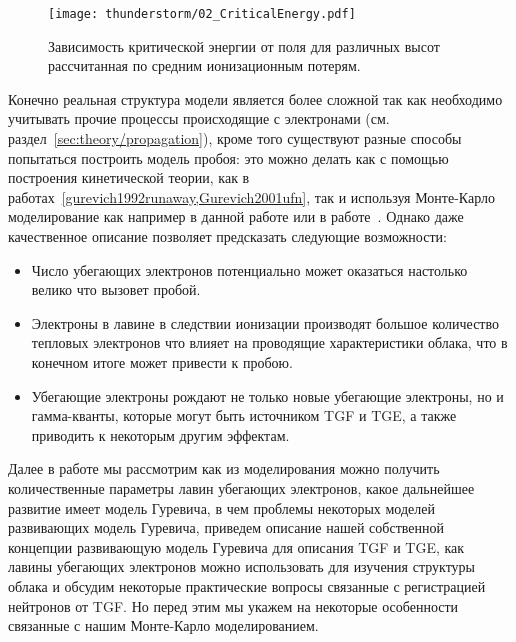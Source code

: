 \begin{figure}[t]
    \begin{center}

\texttt{[image: thunderstorm/02\_CriticalEnergy.pdf]} 
        \caption{Зависимость критической энергии от поля для различных высот рассчитанная по средним ионизационным потерям.}
    \end{center}
    \label{fig:storm:crit}
\end{figure}
Конечно реальная структура модели является более сложной так как необходимо учитывать прочие процессы происходящие с электронами (см. раздел~\ref{sec:theory/propagation}), кроме того существуют разные способы попытаться построить модель пробоя: это можно делать как с помощью построения кинетической теории, как в работах~\ref{gurevich1992runaway,Gurevich2001ufn}, так и используя Монте-Карло моделирование как например в данной работе или в работе~\cite{dwyer2003fundamental}. Однако даже качественное описание позволяет предсказать следующие возможности:
\begin{itemize}
   \item Число убегающих электронов потенциально может оказаться настолько велико что вызовет пробой.
   \item Электроны в лавине в следствии ионизации производят большое количество тепловых электронов что влияет на проводящие характеристики облака, что в конечном итоге может привести к пробою.
   \item Убегающие электроны рождают не только новые убегающие электроны, но и гамма-кванты, которые могут быть источником TGF и TGE, а также приводить к некоторым другим эффектам.
\end{itemize}
Далее в работе мы рассмотрим как из моделирования можно получить количественные параметры лавин убегающих электронов, какое дальнейшее развитие имеет модель Гуревича, в чем проблемы некоторых моделей развивающих модель Гуревича, приведем описание нашей собственной концепции развивающую модель Гуревича для описания TGF и TGE, как лавины убегающих электронов можно использовать для изучения структуры облака и обсудим некоторые практические вопросы связанные с регистрацией нейтронов от TGF. Но перед этим мы укажем на некоторые особенности связанные с нашим Монте-Карло моделированием.




